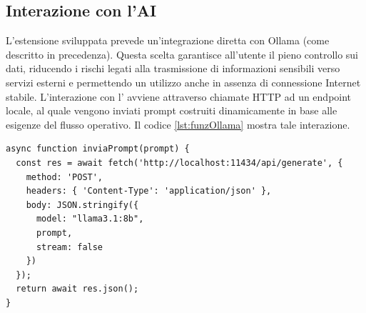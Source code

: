 \subsection{Interazione con l'AI}
\noindent L’estensione sviluppata prevede un’integrazione diretta con Ollama (come descritto in precedenza). Questa scelta garantisce all’utente il pieno controllo sui dati, riducendo i rischi legati alla trasmissione di informazioni sensibili verso servizi esterni e permettendo un utilizzo anche in assenza di connessione Internet stabile. L’interazione con l’ avviene attraverso chiamate HTTP ad un endpoint locale, al quale vengono inviati prompt costruiti dinamicamente in base alle esigenze del flusso operativo. Il codice \ref{lst:funzOllama} mostra tale interazione.

\begin{lstlisting}[style=jsStyle, caption={Funzione di interazione con Ollama}, label={lst:funzOllama}]
async function inviaPrompt(prompt) {
  const res = await fetch('http://localhost:11434/api/generate', {
    method: 'POST',
    headers: { 'Content-Type': 'application/json' },
    body: JSON.stringify({
      model: "llama3.1:8b",
      prompt,
      stream: false
    })
  });
  return await res.json();
}
\end{lstlisting}


